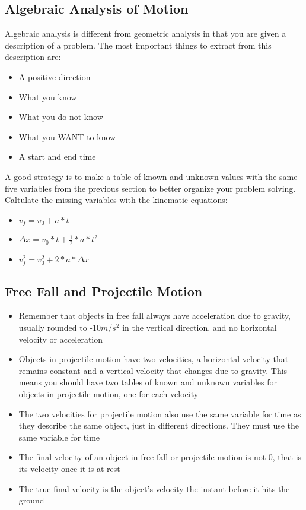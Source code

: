 \subsection{Algebraic Analysis of Motion}
Algebraic analysis is different from geometric analysis in that you are given a description of a problem. The most important things to extract from this description are:
\begin{itemize}
    \item A positive direction
    \item What you know
    \item What you do not know
    \item What you WANT to know
    \item A start and end time
\end{itemize}

A good strategy is to make a table of known and unknown values with the same five variables from the previous section to better organize your problem solving. Caltulate the missing variables with the kinematic equations:
\begin{itemize}
    \item \(v_f=v_0+a*t\)
    \item \(\Delta x = v_0*t+\frac{1}{2}*a*t^2\)
    \item \(v_f^2=v_0^2+2*a*\Delta x\)
\end{itemize}

\subsection{Free Fall and Projectile Motion}
\begin{itemize}
    \item Remember that objects in free fall always have acceleration due to gravity, usually rounded to -10\(m/s^2\) in the vertical direction, and no horizontal velocity or acceleration
    \item Objects in projectile motion have two velocities, a horizontal velocity that remains constant and a vertical velocity that changes due to gravity. This means you should have two tables of known and unknown variables for objects in projectile motion, one for each velocity
    \item The two velocities for projectile motion also use the same variable for time as they describe the same object, just in different directions. They must use the same variable for time
    \item The final velocity of an object in free fall or projectile motion is not 0, that is its velocity once it is at rest
    \item The true final velocity is the object's velocity the instant before it hits the ground
\end{itemize}
